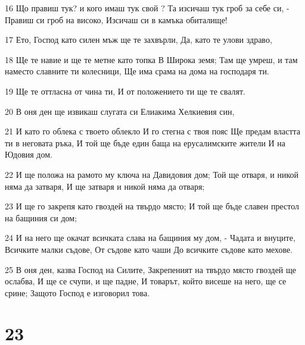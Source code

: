 \par 16 Що правиш тук? и кого имаш тук свой ? Та изсичаш тук гроб за себе си, - Правиш си гроб на високо, Изсичаш си в камъка обиталище!
\par 17 Ето, Господ като силен мъж ще те захвърли, Да, като те улови здраво,
\par 18 Ще те навие и ще те метне като топка В Широка земя; Там ще умреш, и там наместо славните ти колесници, Ще има срама на дома на господаря ти.
\par 19 Ще те оттласна от чина ти, И от положението ти ще те свалят.
\par 20 В оня ден ще извикаш слугата си Елиакима Хелкиевия син,
\par 21 И като го облека с твоето облекло И го стегна с твоя пояс Ще предам властта ти в неговата ръка, И той ще бъде един баща на ерусалимските жители И на Юдовия дом.
\par 22 И ще положа на рамото му ключа на Давидовия дом; Той ще отваря, и никой няма да затваря, И ще затваря и никой няма да отваря;
\par 23 И ще го закрепя като гвоздей на твърдо място; И той ще бъде славен престол на бащиния си дом;
\par 24 И на него ще окачат всичката слава на бащиния му дом, - Чадата и внуците, Всичките малки съдове, От съдове като чаши До всичките съдове като мехове.
\par 25 В оня ден, казва Господ на Силите, Закрепеният на твърдо място гвоздей ще ослабва, И ще се счупи, и ще падне, И товарът, който висеше на него, ще се срине; Защото Господ е изговорил това.

\chapter{23}

